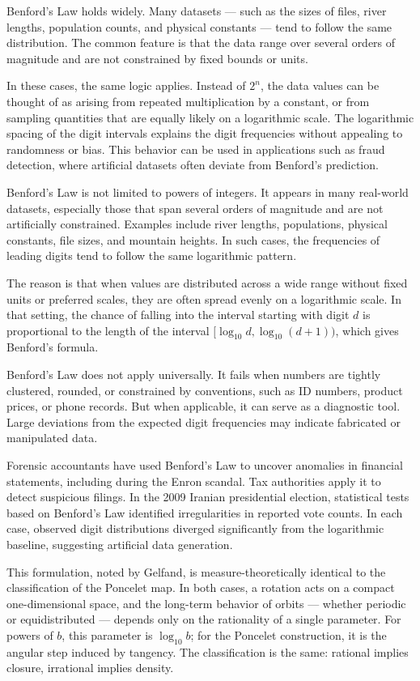 Benford’s Law holds widely. Many datasets — such as the sizes of files, river lengths, population counts, and physical constants — tend to follow the same distribution. The common feature is that the data range over several orders of magnitude and are not constrained by fixed bounds or units.

In these cases, the same logic applies. Instead of $2^n$, the data values can be thought of as arising from repeated multiplication by a constant, or from sampling quantities that are equally likely on a logarithmic scale. The logarithmic spacing of the digit intervals explains the digit frequencies without appealing to randomness or bias. This behavior can be used in applications such as fraud detection, where artificial datasets often deviate from Benford’s prediction.

Benford’s Law is not limited to powers of integers. It appears in many real-world datasets, especially those that span several orders of magnitude and are not artificially constrained. Examples include river lengths, populations, physical constants, file sizes, and mountain heights. In such cases, the frequencies of leading digits tend to follow the same logarithmic pattern.

The reason is that when values are distributed across a wide range without fixed units or preferred scales, they are often spread evenly on a logarithmic scale. In that setting, the chance of falling into the interval starting with digit $d$ is proportional to the length of the interval $[\log_{10} d, \log_{10}(d+1))$, which gives Benford’s formula.

Benford’s Law does not apply universally. It fails when numbers are tightly clustered, rounded, or constrained by conventions, such as ID numbers, product prices, or phone records. But when applicable, it can serve as a diagnostic tool. Large deviations from the expected digit frequencies may indicate fabricated or manipulated data.

Forensic accountants have used Benford's Law to uncover anomalies in financial statements, including during the Enron scandal. Tax authorities apply it to detect suspicious filings. In the 2009 Iranian presidential election, statistical tests based on Benford’s Law identified irregularities in reported vote counts. In each case, observed digit distributions diverged significantly from the logarithmic baseline, suggesting artificial data generation.

This formulation, noted by Gelfand, is measure-theoretically identical to the classification of the Poncelet map. In both cases, a rotation acts on a compact one-dimensional space, and the long-term behavior of orbits — whether periodic or equidistributed — depends only on the rationality of a single parameter. For powers of $b$, this parameter is $\log_{10} b$; for the Poncelet construction, it is the angular step induced by tangency. The classification is the same: rational implies closure, irrational implies density.

